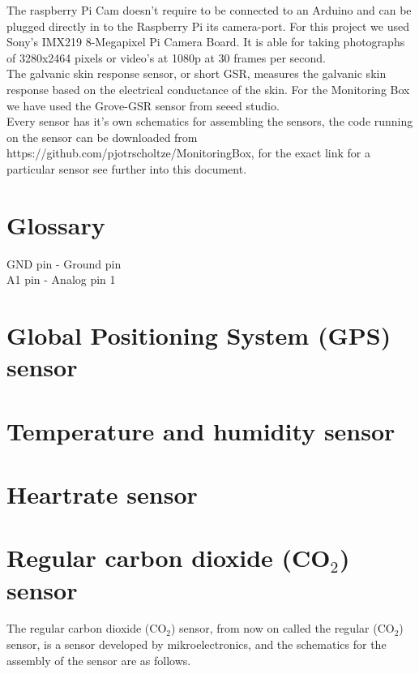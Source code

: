 \documentclass{report}
\begin{document}
The raspberry Pi Cam doesn't require to be connected to an Arduino and can be plugged directly in to the Raspberry Pi its camera-port. For this project we used Sony's IMX219 8-Megapixel Pi Camera Board. It is able for taking photographs of 3280x2464 pixels or video's at 1080p at 30 frames per second. \\

The galvanic skin response sensor, or short GSR, measures the galvanic skin response based on the electrical conductance of the skin. For the Monitoring Box we have used the Grove-GSR sensor from seeed studio.\\

Every sensor has it's own schematics for assembling the sensors, the code running on the sensor can be downloaded from https://github.com/pjotrscholtze/MonitoringBox, for the exact link for a particular sensor see further into this document.  


\chapter{Glossary}

GND pin - Ground pin \\
A1 pin - Analog pin 1


\chapter{Global Positioning System (GPS) sensor}

\chapter{Temperature and humidity sensor}

\chapter{Heartrate sensor}

\chapter{Regular carbon dioxide (CO$_2$) sensor}
The regular carbon dioxide (CO$_2$) sensor, from now on called the regular (CO$_2$) sensor, is a sensor developed by mikroelectronics, and the schematics for the assembly of the sensor are as follows. \\
\end{document}
